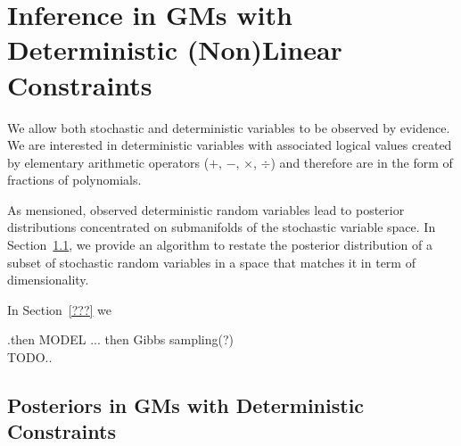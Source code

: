 \documentclass{article}
\begin{document}
\section{Inference in GMs with Deterministic (Non)Linear Constraints}
We allow both stochastic and deterministic variables to be observed by evidence.  
We are interested in deterministic variables with associated logical values  
created by elementary arithmetic operators ($+$, $-$, $\times$, $\div$) and therefore 
are in the form of fractions of polynomials.

As mensioned, observed deterministic random variables lead to posterior distributions concentrated on submanifolds of the stochastic variable space.
In Section~\ref{sect:infer1}, we provide an algorithm to restate the posterior distribution of a subset of stochastic random variables in 
a space that matches it in term of dimensionality.

In Section~\ref{???} we 

 

{\color{red} .then MODEL ... then Gibbs sampling(?)\\TODO..}

\subsection{Posteriors in GMs with Deterministic Constraints}
\label{sect:infer1}
\end{document}

